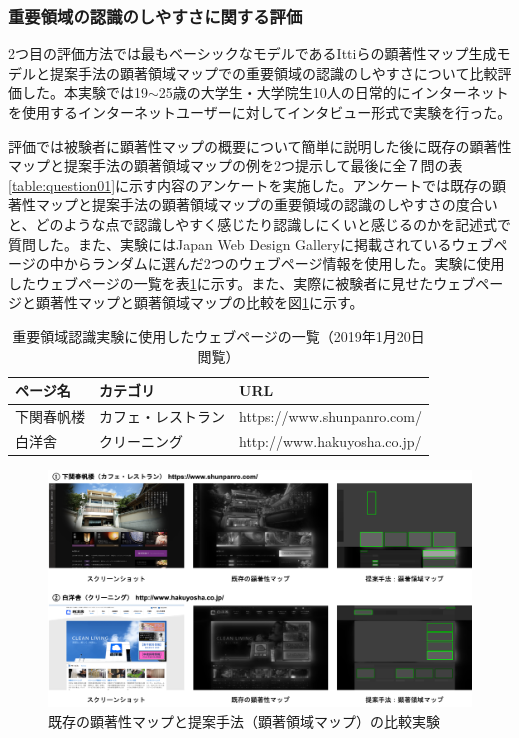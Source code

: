 \subsubsection{重要領域の認識のしやすさに関する評価}
\par 2つ目の評価方法では最もベーシックなモデルであるIttiらの顕著性マップ生成モデル\cite{itti1998model}と提案手法の顕著領域マップでの重要領域の認識のしやすさについて比較評価した。本実験では19$\sim$25歳の大学生・大学院生10人の日常的にインターネットを使用するインターネットユーザーに対してインタビュー形式で実験を行った。

\par 評価では被験者に顕著性マップの概要について簡単に説明した後に既存の顕著性マップと提案手法の顕著領域マップの例を2つ提示して最後に全７問の表\ref{table:question01}に示す内容のアンケートを実施した。アンケートでは既存の顕著性マップと提案手法の顕著領域マップの重要領域の認識のしやすさの度合いと、どのような点で認識しやすく感じたり認識しにくいと感じるのかを記述式で質問した。また、実験にはJapan Web Design Gallery\cite{japanwebgallery}に掲載されているウェブページの中からランダムに選んだ2つのウェブページ情報を使用した。実験に使用したウェブページの一覧を表\ref{table:webpage-list2}に示す。また、実際に被験者に見せたウェブページと顕著性マップと顕著領域マップの比較を図\ref{fig_experience02}に示す。


\begin{table}[h]
  \caption{重要領域認識実験に使用したウェブページの一覧（2019年1月20日閲覧）}
  \label{table:webpage-list2}
  \centering
  \begingroup
  \renewcommand{\arraystretch}{1.2} %
  \small
    \begin{tabular}{lll}
    \hline
    ページ名 & カテゴリ & URL \\
    \hline \hline
    下関春帆楼 & カフェ・レストラン & https://www.shunpanro.com/ \\
    白洋舎 & クリーニング & http://www.hakuyosha.co.jp/ \\
    \hline
  \end{tabular}
  \endgroup
\end{table}

\begin{figure}[H]
  \centering
  \includegraphics[width=12cm]{figures/07_experience02.png}
  \caption{既存の顕著性マップと提案手法（顕著領域マップ）の比較実験}
  \label{fig_experience02}
\end{figure}

